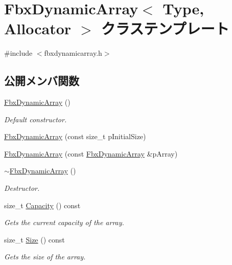 \hypertarget{class_fbx_dynamic_array}{}\section{Fbx\+Dynamic\+Array$<$ Type, Allocator $>$ クラステンプレート}
\label{class_fbx_dynamic_array}


{\ttfamily \#include $<$fbxdynamicarray.\+h$>$}

\subsection*{公開メンバ関数}
\begin{DoxyCompactItemize}
\item 
\hyperlink{class_fbx_dynamic_array_a279819589a3ae9252213f2efeddec299}{Fbx\+Dynamic\+Array} ()
\begin{DoxyCompactList}\small\item\em Default constructor. \end{DoxyCompactList}\item 
\hyperlink{class_fbx_dynamic_array_a51406444b76ab195c4d87ab456385281}{Fbx\+Dynamic\+Array} (const size\+\_\+t p\+Initial\+Size)
\item 
\hyperlink{class_fbx_dynamic_array_aa68b84abe44c5dce24e2aa53ae267698}{Fbx\+Dynamic\+Array} (const \hyperlink{class_fbx_dynamic_array}{Fbx\+Dynamic\+Array} \&p\+Array)
\item 
\hyperlink{class_fbx_dynamic_array_a4e03e546be9c13e36cff068e0243fa92}{$\sim$\+Fbx\+Dynamic\+Array} ()
\begin{DoxyCompactList}\small\item\em Destructor. \end{DoxyCompactList}\item 
size\+\_\+t \hyperlink{class_fbx_dynamic_array_a148f92f13097c3dac6e947880fd978e5}{Capacity} () const
\begin{DoxyCompactList}\small\item\em Gets the current capacity of the array. \end{DoxyCompactList}\item 
size\+\_\+t \hyperlink{class_fbx_dynamic_array_a700fb46d36230bd9ed41f6c6fb420d0b}{Size} () const
\begin{DoxyCompactList}\small\item\em Gets the size of the array. \end{DoxyCompactList}\item 

\end{DoxyCompactItemize}

